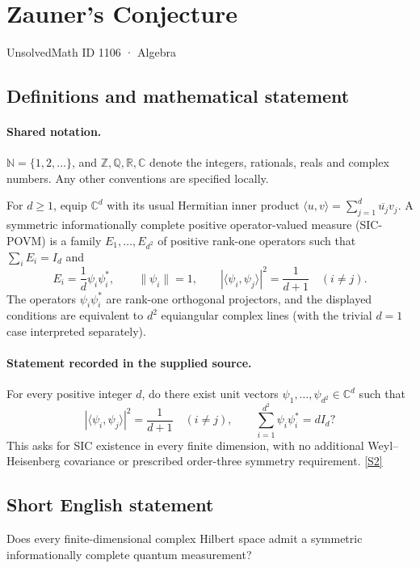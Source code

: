 \documentclass[11pt]{article}
\newcommand{\sref}[2]{\hyperlink{source:#1:#2}{[S#2]}}
\begin{document}
\setcounter{section}{1105}
\section{Zauner's Conjecture}\label{1106}
{\small\sffamily UnsolvedMath ID 1106 · Algebra}
\subsection{Definitions and mathematical statement}

\paragraph{Shared notation.}$\mathbb N=\{1,2,\ldots\}$, and $\mathbb Z,\mathbb Q,\mathbb R,\mathbb C$ denote the integers, rationals, reals and complex numbers. Any other conventions are specified locally.


For $d\geq1$, equip $\mathbb C^d$ with its usual Hermitian inner product $\langle u,v\rangle=\sum_{j=1}^d\overline{u_j}v_j$. A symmetric informationally complete positive operator-valued measure (SIC-POVM) is a family $E_1,\ldots,E_{d^2}$ of positive rank-one operators such that $\sum_iE_i=I_d$ and
\[
 E_i=\frac1d\psi_i\psi_i^*,\qquad
 \|\psi_i\|=1,\qquad
 |\langle\psi_i,\psi_j\rangle|^2=\frac1{d+1}\quad(i\ne j).
\]
The operators $\psi_i\psi_i^*$ are rank-one orthogonal projectors, and the displayed conditions are equivalent to $d^2$ equiangular complex lines (with the trivial $d=1$ case interpreted separately).
\paragraph{Statement recorded in the supplied source.}
For every positive integer $d$, do there exist unit vectors $\psi_1,\ldots,\psi_{d^2}\in\mathbb C^d$ such that
\[
 |\langle\psi_i,\psi_j\rangle|^2=\frac1{d+1}\quad(i\ne j),\qquad
 \sum_{i=1}^{d^2}\psi_i\psi_i^*=dI_d?
\]
This asks for SIC existence in every finite dimension, with no additional Weyl--Heisenberg covariance or prescribed order-three symmetry requirement. \sref{1106}{2}
\subsection{Short English statement}
Does every finite-dimensional complex Hilbert space admit a symmetric informationally complete quantum measurement?
\end{document}
